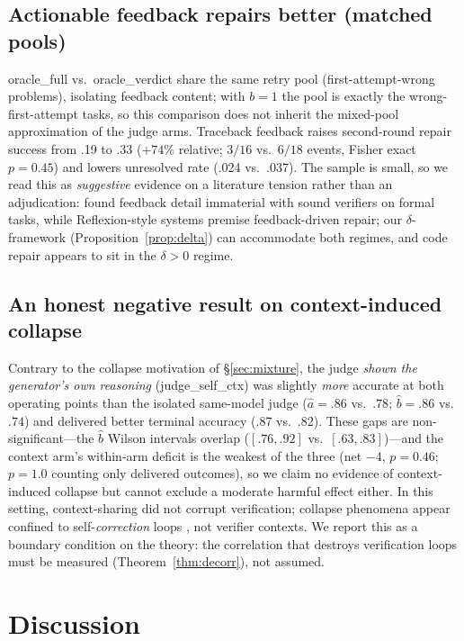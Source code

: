 \documentclass[11pt]{article}
\begin{document}
\subsection{Actionable feedback repairs better (matched pools)}
\textsf{oracle\_full} vs.\ \textsf{oracle\_verdict} share the same
retry pool (first-attempt-wrong problems), isolating feedback
content; with $b=1$ the pool is exactly the wrong-first-attempt
tasks, so this comparison does not inherit the mixed-pool
approximation of the judge arms.  Traceback feedback raises
second-round repair success
from .19 to .33 ($+74\%$ relative; $3/16$ vs.\ $6/18$ events,
Fisher exact $p = 0.45$) and lowers unresolved rate (.024 vs.\
.037).  The sample is small, so we read this as \emph{suggestive}
evidence on a literature tension rather than an adjudication:
\citet{stechly2024selfverify} found feedback detail immaterial with
sound verifiers on formal tasks, while Reflexion-style systems
premise feedback-driven repair; our $\delta$-framework
(Proposition~\ref{prop:delta}) can accommodate both regimes, and
code repair appears to sit in the $\delta>0$ regime.

\subsection{An honest negative result on context-induced collapse}
Contrary to the collapse motivation of §\ref{sec:mixture}, the
judge \emph{shown the generator's own reasoning}
(\textsf{judge\_self\_ctx}) was slightly \emph{more} accurate at
both operating points than the isolated same-model judge
($\hat a = .86$ vs.\ $.78$; $\hat b = .86$ vs.\ $.74$) and delivered
better terminal accuracy (.87 vs.\ .82).  These gaps are
non-significant---the $\hat b$ Wilson intervals overlap
($[.76,.92]$ vs.\ $[.63,.83]$)---and the context arm's within-arm
deficit is the weakest of the three (net $-4$, $p = 0.46$; $p =
1.0$ counting only delivered outcomes), so
we claim no evidence of context-induced collapse but cannot exclude
a moderate harmful effect either.  In this setting,
context-sharing did not corrupt verification; collapse phenomena
appear confined to self-\emph{correction} loops
\citep{stechly2024selfverify}, not verifier contexts.  We report
this as a boundary condition on the theory: the correlation that
destroys verification loops must be measured
(Theorem~\ref{thm:decorr}), not assumed.

\section{Discussion}\label{sec:discussion}
\end{document}

